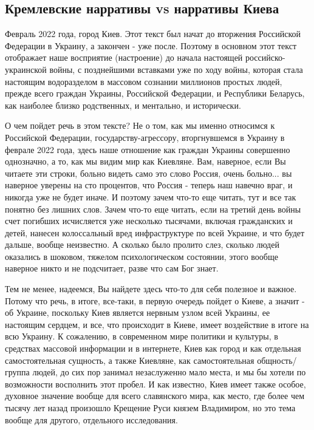  
 
 
 
 

\subsection{Кремлевские нарративы vs нарративы Киева}

Февраль 2022 года, город Киев. Этот текст был начат до вторжения Российской
Федерации в Украину, а закончен - уже после. Поэтому в основном этот текст
отображает наше восприятие (настроение) до начала настоящей
российско-украинской войны, с позднейшими вставками уже по ходу войны, которая
стала настоящим водоразделом в массовом сознании миллионов простых людей,
прежде всего граждан Украины, Российской Федерации, и Республики Беларусь, как
наиболее близко родственных, и ментально, и исторически.

О чем пойдет речь в этом тексте? Не о том, как мы именно относимся к Российской
Федерации, государству-агрессору, вторгнувшемся в Украину в феврале 2022 года,
здесь наше отношение как граждан Украины совершенно однозначно, а то, как мы
видим мир как Киевляне. Вам, наверное, если Вы читаете эти строки, больно
видеть само это слово Россия, очень больно... вы наверное уверены на сто
процентов, что Россия - теперь наш навечно враг, и никогда уже не будет иначе.
И поэтому зачем что-то еще читать, тут и все так понятно без лишних слов. Зачем
что-то еще читать, если на третий день войны счет погибших исчисляется уже
несколько тысячами, включая гражданских и детей, нанесен колоссальный вред
инфраструктуре по всей Украине, и что будет дальше, вообще неизвестно.  А
сколько было пролито слез, сколько людей оказались в шоковом, тяжелом
психологическом состоянии, этого вообще наверное никто и не подсчитает, разве
что сам Бог знает.

Тем не менее, надеемся, Вы найдете здесь что-то для себя полезное и важное.
Потому что речь, в итоге, все-таки, в первую очередь пойдет о Киеве, а значит -
об Украине, поскольку Киев является нервным узлом всей Украины, ее настоящим
сердцем, и все, что происходит в Киеве, имеет воздействие в итоге на всю
Украину. К сожалению, в современном мире политики и культуры, в средствах
массовой информации и в интернете, Киев как город и как отдельная
самостоятельная сущность, а также Киевляне, как самостоятельная общность/группа
людей, до сих пор занимал незаслуженно мало места, и мы бы хотели по возможности
восполнить этот пробел. И как известно, Киев имеет также особое, духовное
значение вообще для всего славянского мира, как место, где более чем тысячу лет
назад произошло Крещение Руси князем Владимиром, но это тема вообще для
другого, отдельного исследования.

